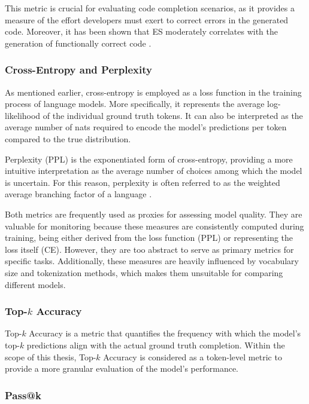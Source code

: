 This metric is crucial for evaluating code completion scenarios, as it provides a measure of the effort developers must exert to correct errors in the generated code. Moreover, it has been shown that ES moderately correlates with the generation of functionally correct code \parencite{dibia2022}.

\subsubsection*{Cross-Entropy and Perplexity}

As mentioned earlier, cross-entropy is employed as a loss function in the training process of language models. More specifically, it represents the average log-likelihood of the individual ground truth tokens. It can also be interpreted as the average number of nats required to encode the model's predictions per token compared to the true distribution.

Perplexity (PPL) is the exponentiated form of cross-entropy, providing a more intuitive interpretation as the average number of choices among which the model is uncertain. For this reason, perplexity is often referred to as the weighted average branching factor of a language \parencite{murphy2022}.

Both metrics are frequently used as proxies for assessing model quality. They are valuable for monitoring because these measures are consistently computed during training, being either derived from the loss function (PPL) or representing the loss itself (CE). However, they are too abstract to serve as primary metrics for specific tasks. Additionally, these measures are heavily influenced by vocabulary size and tokenization methods, which makes them unsuitable for comparing different models.

\subsubsection*{Top-\(k\) Accuracy}

\begin{sloppypar}
Top-\(k\) Accuracy is a metric that quantifies the frequency with which the model's top-\(k\) predictions align with the actual ground truth completion. Within the scope of this thesis, Top-\(k\) Accuracy is considered as a token-level metric to provide a more granular evaluation of the model's performance.
\end{sloppypar}

\subsubsection*{Pass@k}

